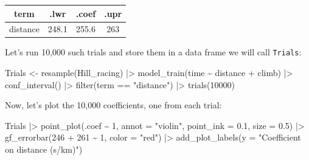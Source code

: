 \documentclass[
  letterpaper,
  DIV=11,
  numbers=noendperiod,
  oneside]{scrartcl}
\newenvironment{Shaded}{\begin{snugshade}}{\end{snugshade}}
\newcommand{\AttributeTok}[1]{\textcolor[rgb]{0.40,0.45,0.13}{#1}}
\newcommand{\DecValTok}[1]{\textcolor[rgb]{0.68,0.00,0.00}{#1}}
\newcommand{\FloatTok}[1]{\textcolor[rgb]{0.68,0.00,0.00}{#1}}
\newcommand{\FunctionTok}[1]{\textcolor[rgb]{0.28,0.35,0.67}{#1}}
\newcommand{\NormalTok}[1]{\textcolor[rgb]{0.00,0.23,0.31}{#1}}
\newcommand{\OtherTok}[1]{\textcolor[rgb]{0.00,0.23,0.31}{#1}}
\newcommand{\SpecialCharTok}[1]{\textcolor[rgb]{0.37,0.37,0.37}{#1}}
\newcommand{\StringTok}[1]{\textcolor[rgb]{0.13,0.47,0.30}{#1}}
\begin{document}
\begin{longtable}[]{@{}cccc@{}}
\toprule\noalign{}
term & .lwr & .coef & .upr \\
\midrule\noalign{}
\endhead
\bottomrule\noalign{}
\endlastfoot
distance & 248.1 & 255.6 & 263 \\
\end{longtable}

Let's run 10,000 such trials and store them in a data frame we will call
\texttt{Trials}:

\begin{Shaded}
\begin{Highlighting}[]
\NormalTok{Trials }\OtherTok{\textless{}{-}} 
  \FunctionTok{resample}\NormalTok{(Hill\_racing) }\SpecialCharTok{|\textgreater{}}
  \FunctionTok{model\_train}\NormalTok{(time }\SpecialCharTok{\textasciitilde{}}\NormalTok{ distance }\SpecialCharTok{+}\NormalTok{ climb) }\SpecialCharTok{|\textgreater{}}
  \FunctionTok{conf\_interval}\NormalTok{() }\SpecialCharTok{|\textgreater{}}
  \FunctionTok{filter}\NormalTok{(term }\SpecialCharTok{==} \StringTok{"distance"}\NormalTok{) }\SpecialCharTok{|\textgreater{}}
  \FunctionTok{trials}\NormalTok{(}\DecValTok{10000}\NormalTok{)}
\end{Highlighting}
\end{Shaded}

Now, let's plot the 10,000 coefficients, one from each trial:

\begin{Shaded}
\begin{Highlighting}[]
\NormalTok{Trials }\SpecialCharTok{|\textgreater{}}
  \FunctionTok{point\_plot}\NormalTok{(.coef }\SpecialCharTok{\textasciitilde{}} \DecValTok{1}\NormalTok{, }\AttributeTok{annot =} \StringTok{"violin"}\NormalTok{, }\AttributeTok{point\_ink =} \FloatTok{0.1}\NormalTok{, }\AttributeTok{size =} \FloatTok{0.5}\NormalTok{) }\SpecialCharTok{|\textgreater{}}
  \FunctionTok{gf\_errorbar}\NormalTok{(}\DecValTok{246} \SpecialCharTok{+} \DecValTok{261} \SpecialCharTok{\textasciitilde{}} \DecValTok{1}\NormalTok{, }\AttributeTok{color =} \StringTok{"red"}\NormalTok{) }\SpecialCharTok{|\textgreater{}}
  \FunctionTok{add\_plot\_labels}\NormalTok{(}\AttributeTok{y =} \StringTok{"Coefficient on distance (s/km)"}\NormalTok{)}
\end{Highlighting}
\end{Shaded}
\end{document}
